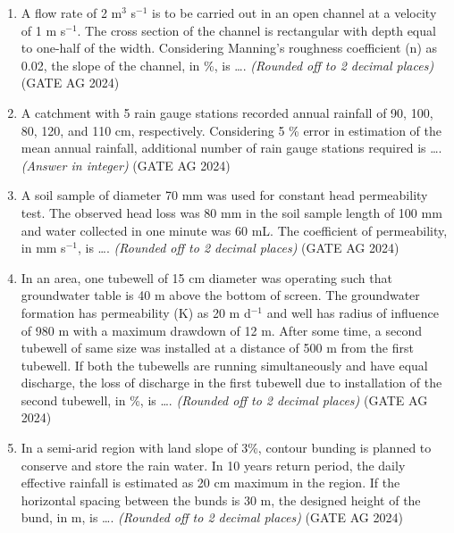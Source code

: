 \documentclass[journal]{IEEEtran}
\begin{document}
\begin{enumerate}
\medskip

\item 
A flow rate of 2 m$^{3}$ s$^{-1}$ is to be carried out in an open channel at a velocity of 1 m s$^{-1}$. The cross section of the channel is rectangular with depth equal to one-half of the width. Considering Manning's roughness coefficient (n) as 0.02, the slope of the channel, in \%, is \dots. \textit{(Rounded off to 2 decimal places)}
 \hfill(GATE AG 2024)\\

\medskip

\item
A catchment with 5 rain gauge stations recorded annual rainfall of 90, 100, 80, 120, and 110 cm, respectively. Considering 5 \% error in estimation of the mean annual rainfall, additional number of rain gauge stations required is \dots. \textit{(Answer in integer)}
 \hfill(GATE AG 2024)\\

\medskip

\item
A soil sample of diameter 70 mm was used for constant head permeability test. The observed head loss was 80 mm in the soil sample length of 100 mm and water collected in one minute was 60 mL. The coefficient of permeability, in mm s$^{-1}$, is \dots. \textit{(Rounded off to 2 decimal places)}
 \hfill(GATE AG 2024)\\

\medskip

\item
In an area, one tubewell of 15 cm diameter was operating such that groundwater table is 40 m above the bottom of screen. The groundwater formation has permeability (K) as 20 m d$^{-1}$ and well has radius of influence of 980 m with a maximum drawdown of 12 m. After some time, a second tubewell of same size was installed at a distance of 500 m from the first tubewell. If both the tubewells are running simultaneously and have equal discharge, the loss of discharge in the first tubewell due to installation of the second tubewell, in \%, is \dots. \textit{(Rounded off to 2 decimal places)}
 \hfill(GATE AG 2024)\\

\medskip

\item
In a semi-arid region with land slope of 3\%, contour bunding is planned to conserve and store the rain water. In 10 years return period, the daily effective rainfall is estimated as 20 cm maximum in the region. If the horizontal spacing between the bunds is 30 m, the designed height of the bund, in m, is \dots. \textit{(Rounded off to 2 decimal places)}
 \hfill(GATE AG 2024)\\


\end{enumerate}
\end{document}
